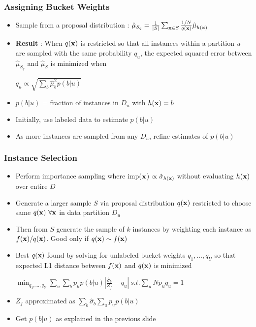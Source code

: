\documentclass[11pt]{beamer}
\newcommand{\vek}[1]{{\bf {#1}}}
\newcommand{\vx}{{\vek{x}}}
\newcommand{\wt}{{p}}
\newcommand{\estSS}{{\mbox{$\hat{\mu}_S$}}}
\newcommand{\estSb}{{\mbox{$\hat{\mu}$}}}
\newcommand{\estVar}{{\mbox{$\hat{\sigma}$}}}
\newlength{\wideitemsep}
\let\olditem\item
\renewcommand{\item}{\setlength{\itemsep}{\wideitemsep}\olditem}
\begin{document}
\begin{frame}
\frametitle{Assigning Bucket Weights}
\begin{itemize}
\item Sample from a proposal distribution : $\hat{\mu}_{S_q} = \frac{1}{|S|}\sum\nolimits_{\vx\in S} \frac{1/N}{q(\vx)}\estSb_{h(\vx)}$
\item \textbf{Result} : When $q(\vx)$ is restricted so that all instances within a partition $u$ are sampled with the same probability $q_u$,
the expected squared error between $\hat{\mu}_{S_q}$ and $\estSS$ is minimized when 
\begin{center} $q_u \propto \sqrt{\sum_{b}\estSb^2_b\wt(b|u)}$ \end{center}
\item $\wt(b|u)$ = fraction of instances in $D_u$ with $h(\vx)=b$
\item Initially, use labeled data to estimate $\wt(b|u)$
\item As more instances are sampled from any $D_u$, refine estimates of $\wt(b|u)$
\end{itemize}
\end{frame}

\begin{frame}
\frametitle{Instance Selection}
\begin{itemize}
\item Perform importance sampling where imp($\vx$) $\propto \estVar_{h(\vx)}$ without evaluating $h(\vx)$ over entire $D$
\item Generate a larger sample $S$ via proposal distribution $q(\vx)$ restricted to choose same $q(\vx) ~\forall \vx$ in data
partition $D_u$ 
\item Then from $S$ generate the sample of $k$ instances by weighting each instance as $f(\vx)/q(\vx)$. Good only if $q(\vx) \sim f(\vx)$
\item Best $q(\vx)$ found by solving for unlabeled bucket weights $q_1,\ldots,q_U$
so that expected L1 distance between $f(\vx)$ and $q(\vx)$ is minimized
\begin{center}
$\min_{q_1,\ldots,q_U} \sum_u\sum_b \wt_u\wt(b|u) \left|\frac{\estVar_b}{Z_f} - q_u\right| ~s.t. \sum_u N\wt_uq_u=1$
\end{center}
\item $Z_f$ approximated as $\sum\nolimits_b\estVar_b\sum\nolimits_u\wt_u\wt(b|u)$
\item Get $\wt(b|u)$ as explained in the previous slide
\end{itemize}
\end{frame}
\end{document}
